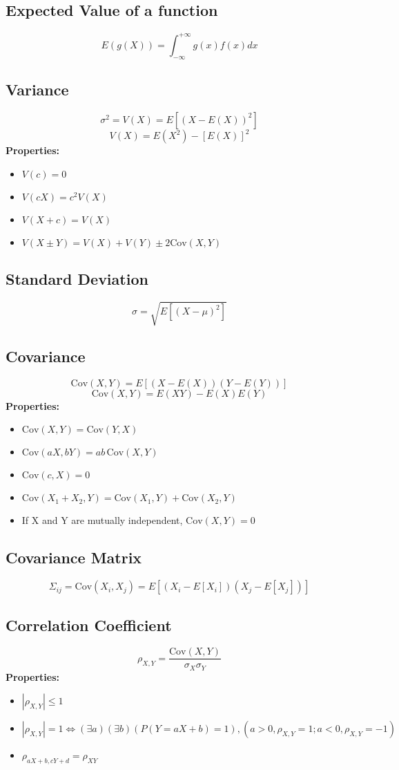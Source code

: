 \documentclass{article}
\begin{document}
\subsection{Expected Value of a function}
\[
    E(g(X)) = \int_{-\infty}^{+\infty} g(x)f(x)dx
\]

\subsection{Variance}
\[
    \sigma^2 = V(X) = E[(X - E(X))^2]
\]
\[
    V(X) = E(X^2) - [E(X)]^2
\]
\textbf{Properties:}
\begin{itemize}
    \item \( V(c) = 0 \)
    \item \( V(cX) = c^2 V(X) \)
    \item \( V(X+c) = V(X) \)
    \item \( V(X \pm Y) = V(X) + V(Y) \pm 2\text{Cov}(X,Y) \)
\end{itemize}

\subsection{Standard Deviation}
\[
    \sigma = \sqrt{E[(X-\mu)^2]}
\]

\subsection{Covariance}
\[
    \text{Cov}(X,Y) = E[(X-E(X))(Y-E(Y))]
\]
\[
    \text{Cov}(X,Y) = E(XY) - E(X)E(Y)
\]
\textbf{Properties:}
\begin{itemize}
    \item \( \text{Cov}(X,Y) = \text{Cov}(Y,X) \)
    \item \( \text{Cov}(aX, bY) = ab\,\text{Cov}(X,Y) \)
    \item \( \text{Cov}(c,X) = 0 \)
    \item \( \text{Cov}(X_1+X_2, Y) = \text{Cov}(X_1,Y) + \text{Cov}(X_2,Y) \)
    \item If X and Y are mutually independent, \( \text{Cov}(X,Y) = 0 \)
\end{itemize}

\subsection{Covariance Matrix}
\[
    \Sigma_{ij} = \text{Cov}(X_i, X_j) = E[(X_i - E[X_i])(X_j - E[X_j])]
\]

\subsection{Correlation Coefficient}
\[
    \rho_{X,Y} = \frac{\text{Cov}(X,Y)}{\sigma_X\sigma_Y}
\]
\textbf{Properties:}
\begin{itemize}
    \item \( |\rho_{X,Y}| \le 1 \)
    \item \( |\rho_{X,Y}| = 1 \Leftrightarrow (\exists a)(\exists b)(P(Y=aX+b)=1), (a>0, \rho_{X,Y}=1; a<0, \rho_{X,Y}=-1) \)
    \item \( \rho_{aX + b, cY + d} = \rho_{XY} \)
\end{itemize}
\end{document}
